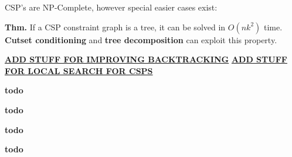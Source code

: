 \documentclass[a4paper,10pt,twocolumn]{article}
\begin{document}
\begin{tcolorbox}[title=Constraint Satisfaction, module]
    \vspace{0.5em}

    CSP's are NP-Complete, however special easier cases exist:
    
    \textbf{Thm. } If a CSP constraint graph is a tree, it can be solved in $O(n k^2)$ time.
    \textbf{Cutset conditioning} and \textbf{tree decomposition} can exploit this property.

    \underline{\textbf{ADD STUFF FOR IMPROVING BACKTRACKING}}
    \underline{\textbf{ADD STUFF FOR LOCAL SEARCH FOR CSPS}}

\end{tcolorbox}

\begin{tcolorbox}[title=Logic, module]
    \textbf{todo}
\end{tcolorbox}

\begin{tcolorbox}[title={Probability \& Uncertainty, Bayesian Networks}, module]
    \textbf{todo}
\end{tcolorbox}

\begin{tcolorbox}[title={Intro to ML, Linear Regression, kNN}, module]
    \textbf{todo}
\end{tcolorbox}

\begin{tcolorbox}[title={Decision Trees and Neural Networks}, module]
    \textbf{todo}
\end{tcolorbox}
\end{document}
